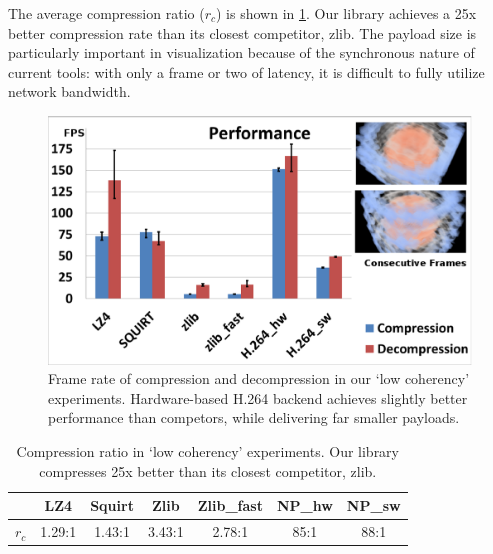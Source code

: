 \documentclass{vgtc}                          %
\begin{document}
The average compression ratio (\(r_c\)) is shown
in \cref{tab:latency}.  Our library achieves a 25x better compression
rate than its closest competitor, zlib.  The payload size is
particularly important in visualization because of the synchronous
nature of current tools: with only a frame or two of latency, it is
difficult to fully utilize network bandwidth.

%

\begin{figure}[t]
  \centering
  \includegraphics[width=\columnwidth]{Performance.eps}
  \caption{Frame rate of compression and decompression in our `low
  coherency' experiments. Hardware-based H.264 backend achieves
  slightly better performance than competors, while delivering far
  smaller payloads.}
  \label{fig:time}
\end{figure}

\begin{table}[htb]
  \vspace{2.5mm}
  \caption{Compression ratio in `low coherency' experiments. Our library
	compresses 25x better than its closest competitor, zlib.}
  \vspace{-4mm}
  \label{tab:latency}
  \scriptsize
  \begin{center}
    \begin{tabular}{ccccccc}
      & LZ4 & Squirt & Zlib & Zlib\_fast & NP\_hw & NP\_sw \\
    \hline
      \(r_c\) & 1.29:1 & 1.43:1 & 3.43:1 & 2.78:1 & 85:1 & 88:1 \\
    \end{tabular}
  \end{center}
  \vspace{-6mm}
\end{table}
\end{document}
